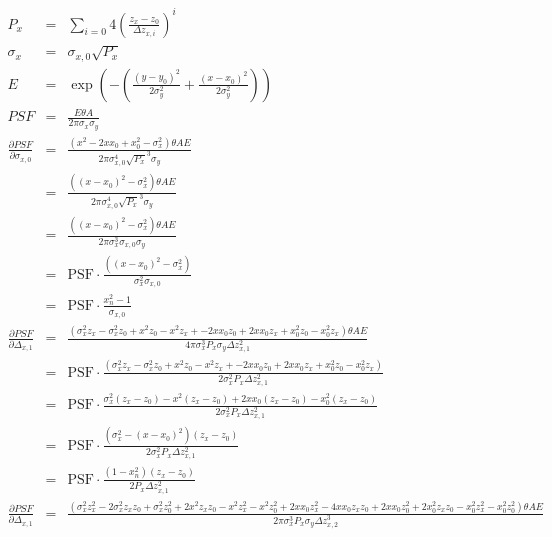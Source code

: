 \begin{eqnarray}
P_x & = & \sum_{i=0}{4} \left( \frac{z_x - z_{0}}{\Delta{}z_{x,i}} \right)^i \\
\sigma_x & = & { \sigma_{x,0} } \sqrt{P_x} \\
E & = & \exp \left(  - \left( \frac{\left( y - y_0\right)  ^{2}}{2 \sigma_y ^{2}}  + \frac{\left( x - x_0\right)  ^{2}}{2 \sigma_y  ^{2}} \right) \right) \\
PSF & = & \frac{E  \theta  A}{2 \pi \sigma_x \sigma_y} \\
\frac{\partial PSF}{\partial \sigma_{x,0}} & = & \frac{\left( x ^{2} - 2 x x_{0} + x_{0} ^{2} - \sigma_x^2 \right)  \theta  A E }{2 \pi \sigma_{x,0} ^{4} \sqrt{P_x} ^{3} \sigma_y} \\
 & = & \frac{\left( \left(x - x_{0}\right)^2 - \sigma_x^2 \right)  \theta  A E }{2 \pi \sigma_{x,0} ^{4} \sqrt{P_x} ^{3} \sigma_y} \\
 & = & \frac{\left( \left(x - x_{0}\right)^2 - \sigma_x^2 \right)  \theta  A E }{2 \pi \sigma_x^3 \sigma_{x,0} \sigma_y} \\
 & = & \mathrm{PSF} \cdot \frac{\left( \left(x - x_{0}\right)^2 - \sigma_x^2 \right) }{\sigma_x^2 \sigma_{x,0}} \\
 & = & \mathrm{PSF} \cdot \frac{x_n^2 - 1 }{\sigma_{x,0}} \\
\frac{\partial PSF}{\partial \Delta_{x,1}} & = & \frac{\left( \sigma_x^2  z_x - \sigma_x^2  z_{0} + x ^{2} z_{0} - x ^{2} z_x + -2 x x_{0} z_{0} + 2 x x_{0} z_x + x_{0} ^{2} z_{0} - x_{0} ^{2} z_x\right)  \theta  A E }{4 \pi \sigma_x^3 P_x \sigma_y \Delta{}z_{x,1} ^{2}} \\
& = & \mathrm{PSF} \cdot \frac{\left( \sigma_x^2  z_x - \sigma_x^2  z_{0} + x ^{2} z_{0} - x ^{2} z_x + -2 x x_{0} z_{0} + 2 x x_{0} z_x + x_{0} ^{2} z_{0} - x_{0} ^{2} z_x\right) }{2 \sigma_x^2 P_x \Delta{}z_{x,1} ^{2}} \\
& = & \mathrm{PSF} \cdot \frac{\sigma_x^2 \left( z_x - z_{0} \right) - x ^{2} \left( z_x - z_{0} \right) + 2 x x_{0} \left( z_x - z_{0} \right) - x_{0} ^{2} \left( z_x - z_{0} \right)  }{2 \sigma_x^2 P_x \Delta{}z_{x,1} ^{2}} \\
& = & \mathrm{PSF} \cdot \frac{\left(\sigma_x^2 - \left(x - x_0\right)^2 \right) \left( z_x - z_{0} \right) }{2 \sigma_x^2 P_x \Delta{}z_{x,1} ^{2}} \\
& = & \mathrm{PSF} \cdot \frac{\left(1 - x_n^2 \right) \left( z_x - z_{0} \right) }{2 P_x \Delta{}z_{x,1} ^{2}} \\
\frac{\partial PSF}{\partial \Delta_{x,1}} & = & \frac{\left( \sigma_x^2  z_x ^{2} - 2 \sigma_x^2  z_x z_{0} + \sigma_x^2  z_{0} ^{2} + 2 x ^{2} z_x z_{0} - x ^{2} z_x ^{2} - x ^{2} z_{0} ^{2} + 2 x x_{0} z_x ^{2} - 4 x x_{0} z_x z_{0} + 2 x x_{0} z_{0} ^{2} + 2 x_{0} ^{2} z_x z_{0} - x_{0} ^{2} z_x ^{2} - x_{0} ^{2} z_{0} ^{2}\right)  \theta  A E }{2 \pi  \sigma_x ^{3} P_x \sigma_y \Delta{}z_{x,2} ^{3}} \\

\end{eqnarray}
